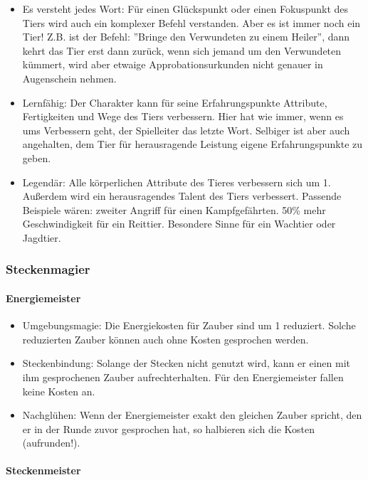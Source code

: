 \documentclass{article}
\begin{document}
\begin{itemize}
\item Es versteht jedes Wort: Für einen Glückspunkt oder einen Fokuspunkt des Tiers wird auch ein komplexer Befehl verstanden. Aber es ist immer noch ein Tier! Z.B. ist der Befehl: ''Bringe den Verwundeten zu einem Heiler'', dann kehrt das Tier erst dann zurück, wenn sich jemand um den Verwundeten kümmert, wird aber etwaige Approbationsurkunden nicht genauer in Augenschein nehmen.
\item Lernfähig: Der Charakter kann für seine Erfahrungspunkte Attribute, Fertigkeiten und Wege des Tiers verbessern. Hier hat wie immer, wenn es ums Verbessern geht, der Spielleiter das letzte Wort. Selbiger ist aber auch angehalten, dem Tier für herausragende Leistung eigene Erfahrungspunkte zu geben.
\item Legendär: Alle körperlichen Attribute des Tieres verbessern sich um 1. Außerdem wird ein herausragendes Talent des Tiers verbessert. Passende Beispiele wären: zweiter Angriff für einen Kampfgefährten. 50\% mehr Geschwindigkeit für ein Reittier. Besondere Sinne für ein Wachtier oder Jagdtier.
\end{itemize}

\subsubsection{Steckenmagier}

\paragraph{Energiemeister}

\begin{itemize}
\item Umgebungsmagie: Die Energiekosten für Zauber sind um 1 reduziert. Solche reduzierten Zauber können auch ohne Kosten gesprochen werden.
\item Steckenbindung: Solange der Stecken nicht genutzt wird, kann er einen mit ihm gesprochenen Zauber aufrechterhalten. Für den Energiemeister fallen keine Kosten an.
\item Nachglühen: Wenn der Energiemeister exakt den gleichen Zauber spricht, den er in der Runde zuvor gesprochen hat, so halbieren sich die Kosten (aufrunden!).
\end{itemize}

\paragraph{Steckenmeister}
\end{document}
